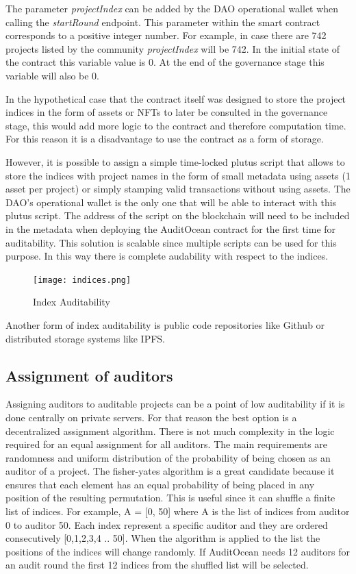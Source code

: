 \documentclass[9pt]{article}
\begin{document}
The parameter \emph{ projectIndex } can be added by the DAO operational wallet when calling the \emph{startRound} endpoint. This parameter within the smart contract corresponds to a positive integer number. For example, in case there are 742 projects listed by the community \emph{ projectIndex } will be 742. In the initial state of the contract this variable value is 0. At the end of the governance stage this variable will also be 0.

In the hypothetical case that the contract itself was designed to store the project indices in the form of assets or NFTs to later be consulted in the governance stage, this would add more logic to the contract and therefore computation time. For this reason it is a disadvantage to use the contract as a form of storage.

However, it is possible to assign a simple time-locked plutus script that allows to store the indices with project names in the form of small metadata using assets (1 asset per project) or simply stamping valid transactions without using assets. The DAO's operational wallet is the only one that will be able to interact with this plutus script. The address of the script on the blockchain will need to be included in the metadata when deploying the AuditOcean contract for the first time for auditability. This solution is scalable since multiple scripts can be used for this purpose. In this way there is complete audability with respect to the indices.


\begin{figure}[ht]
  \centering
  \texttt{[image: indices.png]}
  \caption{Index Auditability
  }
  \label{fig:mi_imagen}
\end{figure}

Another form of index auditability is public code repositories like Github or distributed storage systems like IPFS.
\subsection { Assignment of auditors }
   
Assigning auditors to auditable projects can be a point of low auditability if it is done centrally on private servers. For that reason the best option is a decentralized assignment algorithm. There is not much complexity in the logic required for an equal assignment for all auditors. The main requirements are randomness and uniform distribution of the probability of being chosen as an auditor of a project. The fisher-yates algorithm is a great candidate because it ensures that each element has an equal probability of being placed in any position of the resulting permutation. This is useful since it can shuffle a finite list of indices. For example, A = [0, 50] where A is the list of indices from auditor 0 to auditor 50. Each index represent a specific auditor and they are ordered consecutively [0,1,2,3,4 .. 50]. When the algorithm is applied to the list the positions of the indices will change randomly. If AuditOcean needs 12 auditors for an audit round the first 12 indices from the shuffled list will be selected.\\
\end{document}
